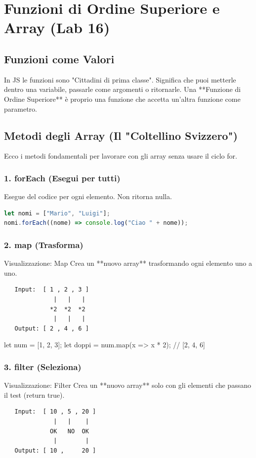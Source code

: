 \section{Funzioni di Ordine Superiore e Array (Lab 16)}

\subsection{Funzioni come Valori}
In JS le funzioni sono "Cittadini di prima classe". Significa che puoi metterle dentro una variabile, passarle come argomenti o ritornarle.
Una **Funzione di Ordine Superiore** è proprio una funzione che accetta un'altra funzione come parametro.

\subsection{Metodi degli Array (Il "Coltellino Svizzero")}
Ecco i metodi fondamentali per lavorare con gli array senza usare il ciclo for.

\subsubsection{1. forEach (Esegui per tutti)}
Esegue del codice per ogni elemento. Non ritorna nulla.
\begin{lstlisting}[language=JavaScript]
let nomi = ["Mario", "Luigi"];
nomi.forEach((nome) => console.log("Ciao " + nome));
\end{lstlisting}

\subsubsection{2. map (Trasforma)}
\begin{concept}{Visualizzazione: Map}
Crea un **nuovo array** trasformando ogni elemento uno a uno.
\begin{verbatim}
   Input:  [ 1 , 2 , 3 ]
              |   |   |
             *2  *2  *2
              |   |   |
   Output: [ 2 , 4 , 6 ]
\end{verbatim}
\end{concept}

\begin{jsbox}
let num = [1, 2, 3];
let doppi = num.map(x => x * 2); // [2, 4, 6]
\end{jsbox}

\subsubsection{3. filter (Seleziona)}
\begin{concept}{Visualizzazione: Filter}
Crea un **nuovo array** solo con gli elementi che passano il test (return true).
\begin{verbatim}
   Input:  [ 10 , 5 , 20 ]
              |   |    |
             OK   NO  OK
              |        |
   Output: [ 10 ,     20 ]
\end{verbatim}
\end{concept}

